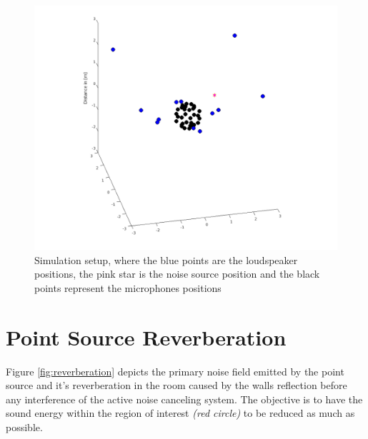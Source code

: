 \begin{figure}
    \centerline{\includegraphics[width=\paperwidth]{LaTeX/images/plots/ANCSetup.png}}
    \caption{Simulation setup, where the blue points are the loudspeaker positions, the pink star is the noise source position and the black points represent the microphones positions}
    \label{fig:setup}
\end{figure}

\section{Point Source Reverberation}
Figure \ref{fig:reverberation} depicts the primary noise field emitted by the point source and it's reverberation in the room caused by the walls reflection before any interference of the active noise canceling system. The objective is to have the sound energy within the region of interest \textit{(red circle)} to be reduced as much as possible.


